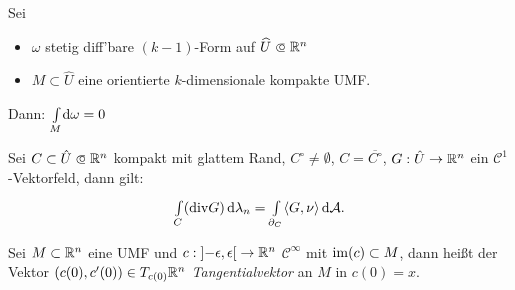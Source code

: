 \documentclass{cheat-sheet}
\theoremstyle{definition}
\newcommand{\Intdf}[2]{{\textstyle \int\limits_{#1}} #2} %
\begin{document}
\iffalse
\begin{satz}[Stokes]
  Gegeben sei
  \begin{itemize}
    \item $M \subset \R^n$ $k$-dimensionale Untermannigfaltigkeit
    \item $\widehat{U} \opn \R^n$, $M \subset \widehat{U}$
    \item $\omega$ stetig diff'bare $(k{-}1)$-Form auf $\widehat{U}$.
    \item $C \subset M$ Kompaktum mit glattem Rand $\partial_M C$.
  \end{itemize}
  Dann gilt (bzgl. der induzierten Orientierung auf $\partial_M C$)
\end{satz}
\fi



\begin{kor}
  Sei
  \begin{itemize}
    \item $\omega$ stetig diff'bare $(k{-}1)$-Form auf $\widehat{U} \opn \R^n$
    \item $M \subset \widehat{U}$ eine orientierte $k$-dimensionale kompakte UMF.
  \end{itemize}
  Dann: $\Intdf{M}{\d \omega} = 0$
\end{kor}



\begin{satz}[Divergenzsatz]
  Sei $C \subset \hat{U} \opn \R^n$ kompakt mit glattem Rand, $C^\circ \not= \emptyset$, $C = \overline{C^\circ}$, $G : \hat{U} \to \mathbb{R}^n$ ein $\mathcal{C}^1$-Vektorfeld, dann gilt:
  \[ {\textstyle \int\limits_{C}^{}} (\mathrm{div} G) \,\mathrm{d} \lambda_n = {\textstyle \int\limits_{\partial_C}^{}} \langle G, \nu \rangle \,\mathrm{d} \mathcal{A}. \]
\end{satz}




\begin{defn}
  Sei $M \subset \R^n$ eine UMF und $c : \left] -\epsilon, \epsilon \right[ \to \mathbb{R}^n$ $\mathcal{C}^\infty$ mit $\mathop{\mathrm{im}}(c) \subset M$, dann heißt der Vektor $(c(0), c'(0)) \in T_{c(0)} \mathbb{R}^n$ \emph{Tangentialvektor} an $M$ in $c(0) = x$.
\end{defn}
\end{document}

